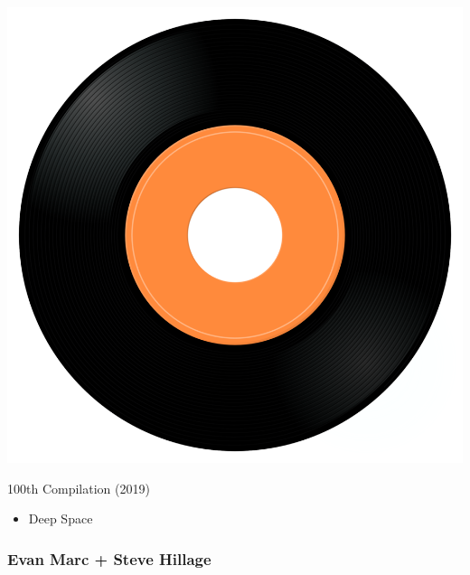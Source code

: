 \begin{minipage}[t]{0.25\textwidth}\vspace{0pt}
\captionsetup{type=figure}
\includegraphics[width=\textwidth]{Images/cover.png}
\caption*{100th Compilation (2019)}
\end{minipage}
\begin{minipage}[t]{0.25\textwidth}\vspace{0pt}
\begin{itemize}[nosep,leftmargin=1em,labelwidth=*,align=left]
	\setlength{\itemsep}{0pt}
	\item Deep Space
\end{itemize}
\end{minipage}

\subsubsection{Evan Marc + Steve Hillage}

